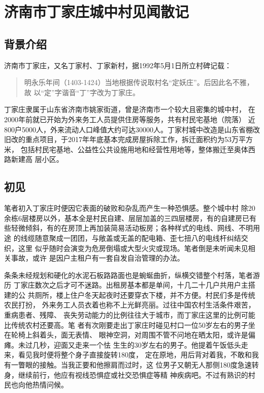  \chapter{济南市丁家庄城中村见闻散记}

  \section{背景介绍}

  济南市丁家庄，又名丁家村、丁家新村，据1992年5月1日所立村碑记载：
  \begin{quotation}
    明永乐年间（1403-1424）当地根据传说取村名“定妖庄”。后因此名不雅，故
    以“定”字谐音“丁”字改为丁家庄。
  \end{quotation}

  丁家庄隶属于山东省济南市姚家街道，曾是济南市一个较大且密集的城中村，
  在2000年前就已开始为外来务工人员提供住房等服务，共有村民宅基地（院落）
  近800户5000人，外来流动人口峰值大约可达30000人。丁家村城中改造是山东省棚改
  旧改的重点项目，于2017年年底基本完成房屋拆除工作，拆迁面积约为53万平方米，
  包括村民宅基地、公益性公共设施用地和经营性用地等，整体搬迁至奥体西路新建高
  层小区。

  \section{初见}

  笔者初入丁家庄时便因它表面的破败和杂乱而产生一种恐惧感。整个城中村
  除20余栋6层楼房以外，基本全是村民自建、层层加盖的三四层楼房，有的自建房已有
  些轻微倾斜，有的在房顶上再加装简易活动板房；各种样式的电线、网线、不明用途
  的线缆随意聚成一团团，与敞盖或无盖的配电箱、歪七扭八的电线杆纠结交织，这里
  似乎随时会演变为危房倒塌或大型火灾或现场。笔者倒是未听闻未见相关事故，或许
  是因户主租户有一套自发自治管理的办法。

  条条未经规划和硬化的水泥石板路路面也是蜿蜒曲折，纵横交错整个村落，笔者游历
  丁家庄数次之后才可不迷路。出租房基本都是单间，十几二十几户共用户主搭建的公
  共厕所，楼上住户冬天起夜时还要穿衣下楼，并不方便。村民们多是传统农民打扮，
  外来务工人员衣着也称不上光鲜亮丽。过往中国农村生活条件艰苦，重病患者、残障、
  丧失劳动能力的比例往往大于城市，而丁家庄这里的比例可能比传统农村还要高。笔
  者有次刚要走出丁家庄时碰见村口一位50岁左右的男子坐在轮椅上斜着头，面无表情、
  眼神空洞，对周围不管不问地在晒太阳，或许是偏瘫。未过几秒，迎面又走来一个怯
  生生的30岁左右的男子。他提着午饭低头走来，看见我时便将整个身子直接旋转180度，
  定在原地，用后背对着我，不敢和我有一瞥眼的接触。当我正要和他擦肩而过时，这
  位男子又朝无人那侧180度急速转身，继续前行，他应有视线恐惧症或社交恐惧症等精
  神疾病吧。不过有熟识的村民也向他热情问候。

